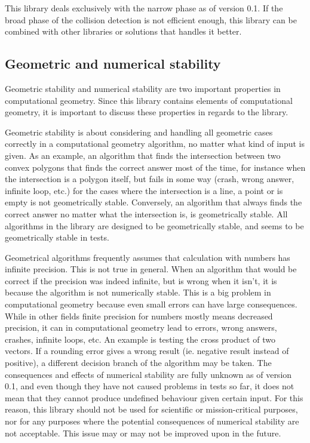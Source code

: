 This library deals exclusively with the narrow phase as of version 0.1.
If the broad phase of the collision detection is not efficient enough,
this library can be combined with other libraries or solutions
that handles it better.

\subsection{Geometric and numerical stability}

Geometric stability and numerical stability are two important properties
in computational geometry. Since this library contains elements of
computational geometry, it is important to discuss these properties
in regards to the library.

Geometric stability is about considering and handling all geometric cases correctly
in a computational geometry algorithm, no matter what kind of input is given.
As an example, an algorithm that finds the intersection between two convex polygons
that finds the correct answer most of the time, for instance when the intersection
is a polygon itself, but fails in some way (crash, wrong answer, infinite loop, etc.)
for the cases where the intersection is a line, a point or is empty is not geometrically
stable. Conversely, an algorithm that always finds the correct answer no matter what the
intersection is, is geometrically stable.
All algorithms in the library are designed to be geometrically stable, and seems to
be geometrically stable in tests.

Geometrical algorithms frequently assumes that calculation with numbers has infinite
precision. This is not true in general. When an algorithm that would be correct
if the precision was indeed infinite, but is wrong when it isn't, it is because the
algorithm is not numerically stable. This is a big problem in computational geometry
because even small errors can have large consequences. While in other fields finite
precision for numbers mostly means decreased precision, it can in computational
geometry lead to errors, wrong answers, crashes, infinite loops, etc.
An example is testing the cross product of two vectors.
If a rounding error gives a wrong result (ie. negative result instead of positive),
a different decision branch of the algorithm may be taken.
The consequences and effects of numerical stability are fully unknown as of version 0.1,
and even though they have not caused problems in tests so far, it does not mean
that they cannot produce undefined behaviour given certain input.
For this reason, this library should not be used for scientific or mission-critical
purposes, nor for any purposes where the potential consequences of numerical stability
are not acceptable. This issue may or may not be improved upon in the future.

